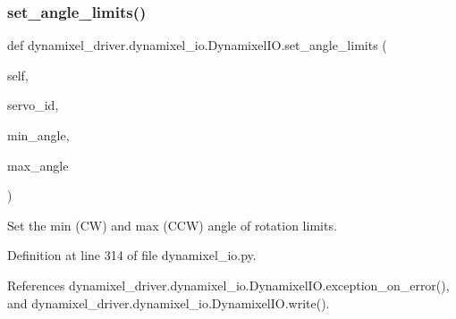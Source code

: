 \subsubsection{\texorpdfstring{set\+\_\+angle\+\_\+limits()}{set\_angle\_limits()}}
{\footnotesize\ttfamily def dynamixel\+\_\+driver.\+dynamixel\+\_\+io.\+Dynamixel\+I\+O.\+set\+\_\+angle\+\_\+limits (\begin{DoxyParamCaption}\item[{}]{self,  }\item[{}]{servo\+\_\+id,  }\item[{}]{min\+\_\+angle,  }\item[{}]{max\+\_\+angle }\end{DoxyParamCaption})}

\begin{DoxyVerb}Set the min (CW) and max (CCW) angle of rotation limits.
\end{DoxyVerb}
 

Definition at line 314 of file dynamixel\+\_\+io.\+py.



References dynamixel\+\_\+driver.\+dynamixel\+\_\+io.\+Dynamixel\+I\+O.\+exception\+\_\+on\+\_\+error(), and dynamixel\+\_\+driver.\+dynamixel\+\_\+io.\+Dynamixel\+I\+O.\+write().


